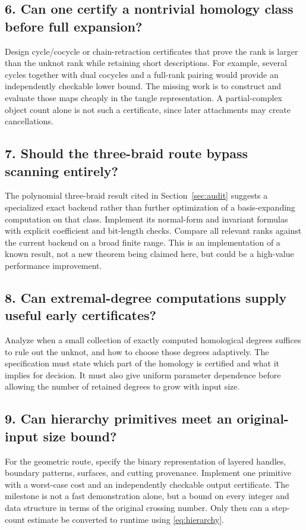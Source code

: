 \documentclass[11pt]{article}
\theoremstyle{definition}\newtheorem{definition}[theorem]{Definition}
\theoremstyle{remark}\newtheorem{remark}[theorem]{Remark}
\begin{document}
\subsection{6. Can one certify a nontrivial homology class before full expansion?}
Design cycle/cocycle or chain-retraction certificates that prove the rank is larger than the unknot rank while retaining short descriptions. For example, several cycles together with dual cocycles and a full-rank pairing would provide an independently checkable lower bound. The missing work is to construct and evaluate those maps cheaply in the tangle representation. A partial-complex object count alone is not such a certificate, since later attachments may create cancellations.

\subsection{7. Should the three-braid route bypass scanning entirely?}
The polynomial three-braid result cited in Section~\ref{sec:audit} suggests a specialized exact backend rather than further optimization of a basis-expanding computation on that class. Implement its normal-form and invariant formulas with explicit coefficient and bit-length checks. Compare all relevant ranks against the current backend on a broad finite range. This is an implementation of a known result, not a new theorem being claimed here, but could be a high-value performance improvement.

\subsection{8. Can extremal-degree computations supply useful early certificates?}
Analyze when a small collection of exactly computed homological degrees suffices to rule out the unknot, and how to choose those degrees adaptively. The specification must state which part of the homology is certified and what it implies for decision. It must also give uniform parameter dependence before allowing the number of retained degrees to grow with input size.

\subsection{9. Can hierarchy primitives meet an original-input size bound?}
For the geometric route, specify the binary representation of layered handles, boundary patterns, surfaces, and cutting provenance. Implement one primitive with a worst-case cost and an independently checkable output certificate. The milestone is not a fast demonstration alone, but a bound on every integer and data structure in terms of the original crossing number. Only then can a step-count estimate be converted to runtime using \eqref{eq:hierarchy}.
\end{document}
